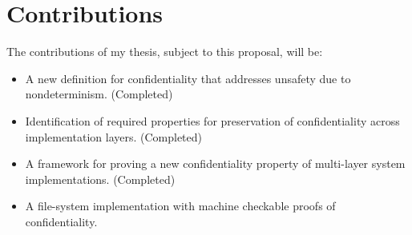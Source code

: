 \section{Contributions}

The contributions of my thesis, subject to this proposal, will be:

\begin{itemize}
 \item A new definition for confidentiality that addresses unsafety due to nondeterminism. (Completed)
 \item Identification of required properties for preservation of confidentiality across implementation layers. (Completed)
 \item A framework for proving a new confidentiality property of multi-layer system implementations. (Completed)
 \item A file-system implementation with machine checkable proofs of confidentiality.
\end{itemize}